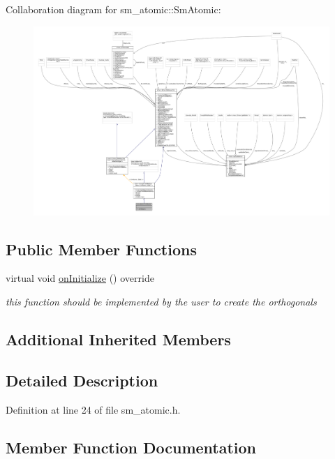 Collaboration diagram for sm\+\_\+atomic\+:\+:Sm\+Atomic\+:
\nopagebreak
\begin{figure}[H]
\begin{center}
\leavevmode
\includegraphics[width=350pt]{structsm__atomic_1_1SmAtomic__coll__graph}
\end{center}
\end{figure}
\subsection*{Public Member Functions}
\begin{DoxyCompactItemize}
\item 
virtual void \hyperlink{structsm__atomic_1_1SmAtomic_ac87a3d5a78eb48b949b3948f9ce28d24}{on\+Initialize} () override
\begin{DoxyCompactList}\small\item\em this function should be implemented by the user to create the orthogonals \end{DoxyCompactList}\end{DoxyCompactItemize}
\subsection*{Additional Inherited Members}


\subsection{Detailed Description}


Definition at line 24 of file sm\+\_\+atomic.\+h.



\subsection{Member Function Documentation}
